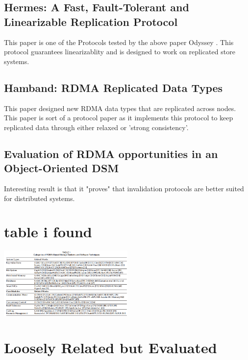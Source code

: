 \documentclass[sigplan,nonacm]{acmart}
\begin{document}
    \subsection {Hermes: A Fast, Fault-Tolerant and Linearizable Replication Protocol}
    This paper \cite{Katsarakis-ASPLOS-2020} is one of the Protocols tested by the above paper Odyssey \cite{Gavrielatos-EuroSys-2021}. This 
    protocol guarantees linearizablity and is designed to work on replicated store systems.

    \subsection {Hamband: RDMA Replicated Data Types}
    This paper \cite{Houshmand-PLDI-2022} designed new RDMA data types that are replicated across nodes. This paper 
    is sort of a protocol paper as it implements this protocol to keep replicated data through either relaxed or 'strong consistency'.

    \subsection{Evaluation of RDMA opportunities in an Object-Oriented DSM}
    Interesting result is that it "proves" that invalidation protocols are better suited 
    for distributed systems. \cite{Veldema-LCPC-2007}
\section{table i found}
\includegraphics[width=0.5\textwidth]{Table_1_A_Survey_of_Storage_Systems_in_the_RDMA_Era}
\cite{Ma-PDS-2022}
\section{Loosely Related but Evaluated}
\end{document}
